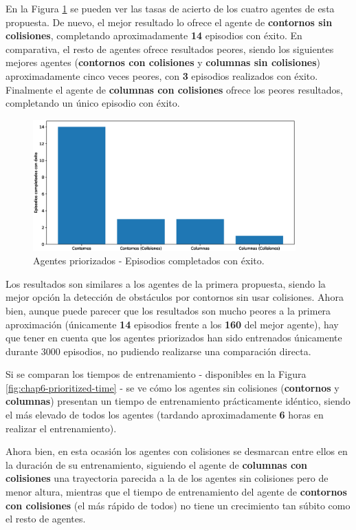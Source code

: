 En la Figura \ref{fig:chap6-prioritized-success} se pueden ver las tasas de acierto de los cuatro agentes de esta propuesta. De nuevo, el mejor resultado lo ofrece el agente de \textbf{contornos sin colisiones}, completando aproximadamente \textbf{14} episodios con éxito. En comparativa, el resto de agentes ofrece resultados peores, siendo los siguientes mejores agentes (\textbf{contornos con colisiones} y \textbf{columnas sin colisiones}) aproximadamente cinco veces peores, con \textbf{3} episodios realizados con éxito. Finalmente el agente de \textbf{columnas con colisiones} ofrece los peores resultados, completando un único episodio con éxito.

\begin{figure}[h]
    \centering
    \includegraphics[width=0.9\textwidth]{imagenes/cap6/prioritized/success.eps}
    \caption{Agentes priorizados - Episodios completados con éxito.}
    \label{fig:chap6-prioritized-success}
\end{figure}

Los resultados son similares a los agentes de la primera propuesta, siendo la mejor opción la detección de obstáculos por contornos sin usar colisiones. Ahora bien, aunque puede parecer que los resultados son mucho peores a la primera aproximación (únicamente \textbf{14} episodios frente a los \textbf{160} del mejor agente), hay que tener en cuenta que los agentes priorizados han sido entrenados únicamente durante 3000 episodios, no pudiendo realizarse una comparación directa.

Si se comparan los tiempos de entrenamiento - disponibles en la Figura \ref{fig:chap6-prioritized-time} - se ve cómo los agentes sin colisiones (\textbf{contornos} y \textbf{columnas}) presentan un tiempo de entrenamiento prácticamente idéntico, siendo el más elevado de todos los agentes (tardando aproximadamente \textbf{6} horas en realizar el entrenamiento).

Ahora bien, en esta ocasión los agentes con colisiones se desmarcan entre ellos en la duración de su entrenamiento, siguiendo el agente de \textbf{columnas con colisiones} una trayectoria parecida a la de los agentes sin colisiones pero de menor altura, mientras que el tiempo de entrenamiento del agente de \textbf{contornos con colisiones} (el más rápido de todos) no tiene un crecimiento tan súbito como el resto de agentes.

